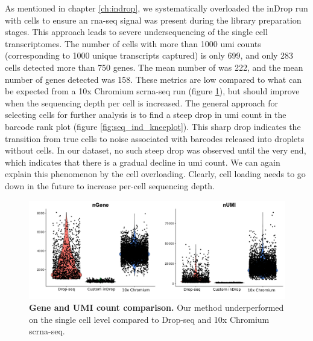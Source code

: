 As mentioned in chapter \ref{ch:indrop}, we systematically overloaded the inDrop run with cells to ensure an \acrshort{rna-seq} signal was present during the library preparation stages. This approach leads to severe undersequencing of the single cell transcriptomes. The number of cells with more than 1000 \acrshort{umi} counts (corresponding to 1000 unique transcripts captured) is only 699, and only 283 cells detected more than 750 genes. The mean number of  was 222, and the mean number of genes detected was 158. These metrics are low compared to what can be expected from a 10x Chromium \acrshort{scrna-seq} run (figure \ref{fig:seq_compar_ngene_numi}), but should improve when the sequencing depth per cell is increased. The general approach for selecting cells for further analysis is to find a steep drop in \acrshort{umi} count in the barcode rank plot (figure \ref{fig:seq_ind_kneeplot}). This sharp drop indicates the transition from true cells to noise associated with barcodes released into droplets without cells. In our dataset, no such steep drop was observed until the very end, which indicates that there is a gradual decline in \acrshort{umi} count. We can again explain this phenomenon by the cell overloading. Clearly, cell loading needs to go down in the future to increase per-cell sequencing depth.\pms

\begin{figure}[ht]
\centerfloat
\includegraphics[width=\textwidth]{./ims/seq_ngenenumicompar.png}
\caption[Gene and UMI count comparison]{\textbf{Gene and UMI count comparison.} Our method underperformed on the single cell level compared to Drop-seq and 10x Chromium \acrshort{scrna-seq}.}
\label{fig:seq_compar_ngene_numi}
\end{figure}


